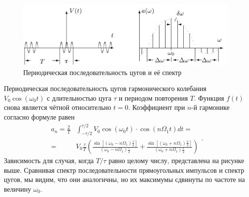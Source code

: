 \documentclass[a4paper, fontsize=14pt]{article}
\begin{document}
\begin{figure}[H]
\center
\includegraphics[scale=0.2]{gr2.png}
\caption{Периодическая последовательность цугов и её спектр}
\end{figure}
Периодическая последовательность цугов гармонического колебания $V_0 \cos (\omega_0 t)$ с длительностью цуга $\tau$ и периодом повторения $T$. Функция $f(t)$ снова является чётной относительно $t = 0$. Коэффициент при $n$-й гармонике согласно формуле равен
\[
\begin{aligned} a_{n}=\frac{2}{T} & \int_{-\tau / 2}^{\tau / 2} V_{0} \cos \left(\omega_{0} t\right) \cdot \cos \left(n \Omega_{1} t\right) d t=\\=& V_{0} \frac{\tau}{T}\left(\frac{\sin \left[\left(\omega_{0}-n \Omega_{1}\right) \frac{\tau}{2}\right]}{\left(\omega_{0}-n \Omega_{1}\right) \frac{\tau}{2}}+\frac{\sin \left[\left(\omega_{0}+n \Omega_{1}\right) \frac{\pi}{2}\right]}{\left(\omega_{0}+n \Omega_{1}\right) \frac{\pi}{2}}\right) \end{aligned}.
\]
Зависимость для случая, когда $T / \tau$ равно целому числу, представлена на рисунке выше. Сравнивая спектр последовательности прямоугольных импульсов и спектр цугов, мы видим, что они аналогичны, но их максимумы сдвинуты по частоте на величину $\omega_0$.
\end{document}
